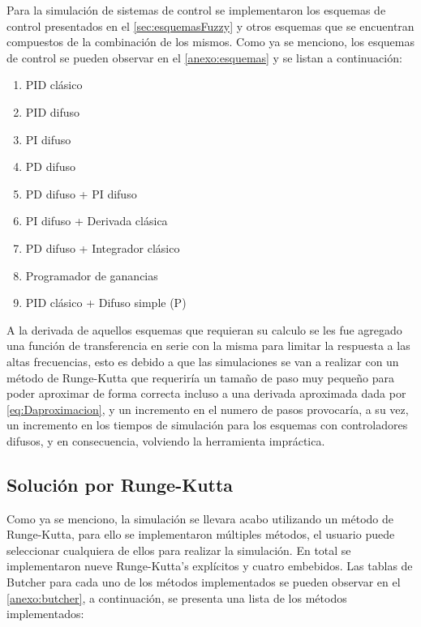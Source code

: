        Para la simulación de sistemas de control se implementaron los esquemas de control presentados en el \cref{sec:esquemasFuzzy} y otros esquemas que se encuentran compuestos de la combinación de los mismos. Como ya se menciono, los esquemas de control se pueden observar en el \ref{anexo:esquemas} y se listan a continuación:

        \begin{enumerate}[leftmargin=\parindent]
            \item PID clásico
            \item PID difuso
            \item PI difuso
            \item PD difuso
            \item PD difuso + PI difuso
            \item PI difuso + Derivada clásica
            \item PD difuso + Integrador clásico
            \item Programador de ganancias
            \item PID clásico + Difuso simple (P)
        \end{enumerate}

        A la derivada de aquellos esquemas que requieran su calculo se les fue agregado una función de transferencia en serie con la misma para limitar la respuesta a las altas frecuencias, esto es debido a que las simulaciones se van a realizar con un método de Runge-Kutta que requeriría un tamaño de paso muy pequeño para poder aproximar de forma correcta incluso a una derivada aproximada dada por \cref{eq:Daproximacion}, y un incremento en el numero de pasos provocaría, a su vez, un incremento en los tiempos de simulación para los esquemas con controladores difusos, y en consecuencia, volviendo la herramienta impráctica.

    \subsection{Solución por Runge-Kutta}

        Como ya se menciono, la simulación se llevara acabo utilizando un método de Runge-Kutta, para ello se implementaron múltiples métodos, el usuario puede seleccionar cualquiera de ellos para realizar la simulación. En total se implementaron nueve Runge-Kutta's explícitos y cuatro embebidos. Las tablas de Butcher para cada uno de los métodos implementados se pueden observar en el \ref{anexo:butcher}, a continuación, se presenta una lista de los métodos implementados:

